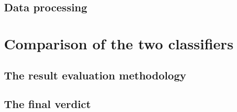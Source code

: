 \documentclass[12pt]{article}
\begin{document}
\subsection{Data processing}				\label{sec:processing2}			

\section{Comparison of the two classifiers}		\label{sec:comparison}
\subsection{The result evaluation methodology}	\label{sec:evaluation}			
\subsection{The final verdict}				\label{sec:verdict}				

\end{document}

